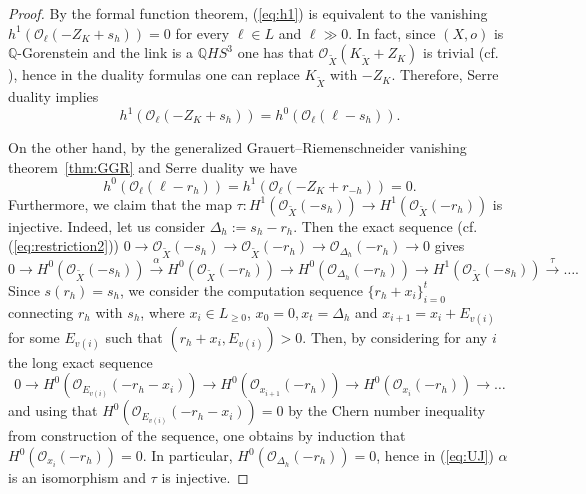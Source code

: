 \documentclass[12pt,a4paper]{amsart}
\def\Q{\mathbb{Q}}
\def\cO{\mathcal{O}}
\def\ZK{Z_K}
\theoremstyle{remark}
\theoremstyle{definition}
\begin{document}
\begin{proof}
By the formal function theorem, (\ref{eq:h1}) is equivalent to the vanishing 
$h^1(\cO_{\ell}(-Z_K+s_{h}))=0$ for every $\ell\in L$ and $\ell\gg 0$. In fact, since $(X,o)$ is $\Q$-Gorenstein and the link is a $\Q HS^3$ one has that $\cO_{\tilde X}(K_{\tilde X}+Z_K)$ is trivial (cf. \cite[6.3.27]{nbook}), hence in the duality formulas one can replace $K_{\tilde X}$ with $-\ZK$. 
Therefore,  Serre duality implies 
\begin{equation}\label{eq:help1}
h^1(\cO_{\ell}(-Z_K+s_{h}))=h^0(\cO_{\ell}(\ell-s_h)).
\end{equation}

On the other hand, by the generalized Grauert--Riemenschneider vanishing theorem~\ref{thm:GGR}
and Serre duality we have 
\begin{equation}\label{eq:MAIN9}
h^0(\cO_{\ell}(\ell-r_h))=h^1(\cO_{\ell}(-Z_K+r_{-h}))=0.
\end{equation}
Furthermore, we claim that the map $\tau:H^1(\cO_{{\tilde X}}(-s_h))\to H^1(\cO_{{\tilde X}}(-r_h))$ is injective. Indeed, let us consider $\Delta_h:=s_h-r_h$. Then the exact sequence (cf.  (\ref{eq:restriction2}))
$0\to \cO_{{\tilde X}}(-s_h)\to \cO_{{\tilde X}}(-r_h)\to \cO_{\Delta_h}(-r_h)\to 0$ gives 
\begin{equation}\label{eq:UJ}
0\to H^0(\cO_{{\tilde X}}(-s_h))\xrightarrow{\alpha} H^0(\cO_{{\tilde X}}(-r_h)) \to H^0(\cO_{\Delta_h}(-r_h))\to H^1(\cO_{{\tilde X}}(-s_h))\xrightarrow{\tau} \dots .
\end{equation}
Since $s(r_h)=s_h$, we consider the computation sequence $\{r_h+x_i\}_{i=0}^{t}$ connecting $r_h$ with $s_h$, where $x_i\in L_{\geq 0}$, $x_0=0, x_t=\Delta_h$ and $x_{i+1}=x_i+E_{v(i)}$ for some $E_{v(i)}$ such that $(r_h+x_i,E_{v(i)})>0$. Then, by considering for any $i$ the long exact sequence
$$0\to H^0(\cO_{E_{v(i)}}(-r_h-x_i))\to H^0(\cO_{x_{i+1}}(-r_h))\to H^0(\cO_{x_{i}}(-r_h))\to \dots$$
and using that $H^0(\cO_{E_{v(i)}}(-r_h-x_i))=0$ by the Chern number inequality from construction of the sequence, one obtains 
 by induction that $H^0(\cO_{x_{i}}(-r_h))=0$. 
 In particular, $H^0(\cO_{\Delta_h}(-r_h))=0$, hence in (\ref{eq:UJ}) 
  $\alpha$ is an isomorphism and $\tau$ is injective.


\end{proof}
\end{document}
